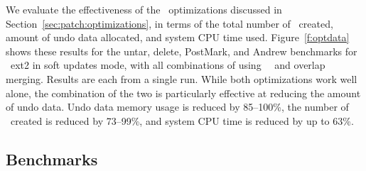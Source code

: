 \opttable{}

We evaluate the effectiveness of the \patch\ optimizations discussed in
Section~\ref{sec:patch:optimizations}, in terms of
%
the total number of \patches\ created, amount of undo data allocated,
and system CPU time used.
%
Figure~\ref{f:optdata} shows these results for the untar, delete,
PostMark, and Andrew benchmarks for \Kudos\ ext2 in soft updates mode,
with all combinations of using \nrb\ \patches\ and overlap merging.
Results are each from a single run.
%
While both optimizations work well alone, the combination of the two
is particularly effective at reducing the amount of undo data.
%
Undo data memory usage is reduced by 85--100\%,
%
the number of \patches\ created is reduced by 73--99\%,
%
and system CPU time is reduced by up to 63\%.
%

\begin{comment}
\begin{figure}[t]
\vspace{-0.5\baselineskip}
\centering{
\texttt{[image: rb\_patch\_size]}
}
\vspace{-0.5\baselineskip}
\caption{\label{fig:patchsize-histo} \Rb\ \patch\ size histogram for a sample
workload (extracting a large archive into ext2). All the \patches\ larger than
63 bytes have been optimized into \nrb\ \patches. \Rb\ \patches\ 4 bytes and
smaller account for about 51\% of all \rb\ \patches.}
\end{figure}
\end{comment}

\subsection {Benchmarks}
\label{sec:eval:bench}

\newcommand{\safe}[1]{\textbf{#1}}
\newcommand{\unsafe}[1]{#1}

